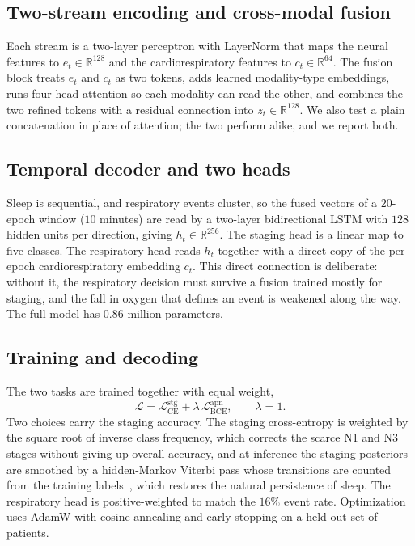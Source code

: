 \documentclass[journal]{IEEEtran}
\begin{document}
\subsection{Two-stream encoding and cross-modal fusion}
Each stream is a two-layer perceptron with LayerNorm that maps the neural features to
$e_t\in\mathbb{R}^{128}$ and the cardiorespiratory features to $c_t\in\mathbb{R}^{64}$. The
fusion block treats $e_t$ and $c_t$ as two tokens, adds learned modality-type embeddings,
runs four-head attention so each modality can read the other, and combines the two refined
tokens with a residual connection into $z_t\in\mathbb{R}^{128}$. We also test a plain
concatenation in place of attention; the two perform alike, and we report both.

\subsection{Temporal decoder and two heads}
Sleep is sequential, and respiratory events cluster, so the fused vectors of a $20$-epoch
window ($10$ minutes) are read by a two-layer bidirectional LSTM with $128$ hidden units per
direction, giving $h_t\in\mathbb{R}^{256}$. The staging head is a linear map to five classes.
The respiratory head reads $h_t$ together with a direct copy of the per-epoch
cardiorespiratory embedding $c_t$. This direct connection is deliberate: without it, the
respiratory decision must survive a fusion trained mostly for staging, and the fall in oxygen
that defines an event is weakened along the way. The full model has $0.86$ million parameters.

\subsection{Training and decoding}
The two tasks are trained together with equal weight,
\begin{equation}
\mathcal{L}=\mathcal{L}^{\mathrm{stg}}_{\mathrm{CE}}+\lambda\,\mathcal{L}^{\mathrm{apn}}_{\mathrm{BCE}},
\qquad \lambda=1 .
\end{equation}
Two choices carry the staging accuracy. The staging cross-entropy is weighted by the square
root of inverse class frequency, which corrects the scarce N1 and N3 stages without giving up
overall accuracy, and at inference the staging posteriors are smoothed by a hidden-Markov
Viterbi pass whose transitions are counted from the training labels~\cite{chen2024hmm}, which
restores the natural persistence of sleep. The respiratory head is positive-weighted to match
the $16\%$ event rate. Optimization uses AdamW with cosine annealing and early stopping on a
held-out set of patients.
\end{document}
